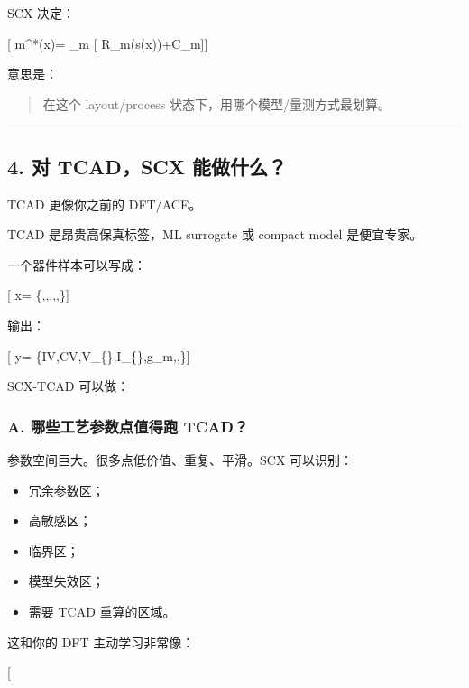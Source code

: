 \documentclass[
  12pt,
]{ctexart}
\providecommand{\tightlist}{%
  \setlength{\itemsep}{0pt}\setlength{\parskip}{0pt}}
\begin{document}
SCX 决定：

{[} m\^{}*(x)= \arg\min\_m {[} R\_m(s(x))+\lambda C\_m{]}{]}

意思是：

\begin{quote}
在这个 layout/process 状态下，用哪个模型/量测方式最划算。
\end{quote}

\begin{center}\rule{0.5\linewidth}{0.5pt}\end{center}

\subsection{4. 对 TCAD，SCX
能做什么？}\label{ux5bf9-tcadscx-ux80fdux505aux4ec0ux4e48}

TCAD 更像你之前的 DFT/ACE。

TCAD 是昂贵高保真标签，ML surrogate 或 compact model 是便宜专家。

一个器件样本可以写成：

{[} x=
\{,,,,,\}{]}

输出：

{[} y=
\{I\text{-}V,C\text{-}V,V\_\{\},I\_\{\},g\_m,,\}{]}

SCX-TCAD 可以做：

\subsubsection{A. 哪些工艺参数点值得跑
TCAD？}\label{a.-ux54eaux4e9bux5de5ux827aux53c2ux6570ux70b9ux503cux5f97ux8dd1-tcad}

参数空间巨大。很多点低价值、重复、平滑。SCX 可以识别：

\begin{itemize}
\tightlist
\item
  冗余参数区；
\item
  高敏感区；
\item
  临界区；
\item
  模型失效区；
\item
  需要 TCAD 重算的区域。
\end{itemize}

这和你的 DFT 主动学习非常像：

{[}  \leftrightarrow
\text{TCAD expensive oracle}{]}
\end{document}
